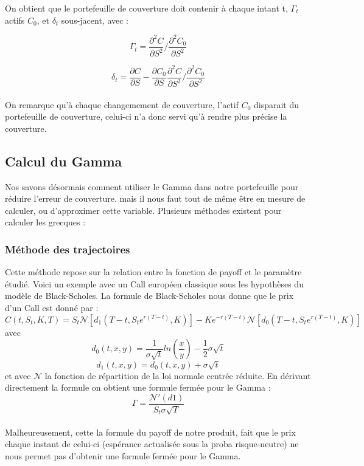 \documentclass[french,12pt,a4paper]{article}
\begin{document}
On obtient que le portefeuille de couverture doit contenir à chaque intant t,  $\Gamma_t$ actifs $C_0$, et $\delta_t$ sous-jacent, avec : 

$$ \Gamma_t = \frac{\partial^2 C}{\partial S^2} \slash \frac{\partial^2 C_0}{\partial S^2}  $$ 

$$ \delta_t = \frac{\partial C}{\partial S} - \frac{\partial C_0}{\partial S} \frac{\partial^2 C}{\partial S^2} \slash \frac{\partial^2 C_0}{\partial S^2}    $$
\\
On remarque qu'à chaque changemement de couverture, l'actif $C_0$ disparait du portefeuille de couverture, celui-ci n'a donc servi qu'à rendre plus précise la couverture.
\subsection{Calcul du Gamma}
Nos savons désormais comment utiliser le Gamma dans notre portefeuille pour réduire l'erreur de couverture. mais il nous faut tout de même être en mesure de calculer, ou d'approximer cette variable. Plusieurs méthodes existent pour calculer les grecques : 
\subsubsection{Méthode des trajectoires}
Cette méthode repose sur la relation entre la fonction de payoff et le paramètre étudié. Voici un exemple avec un Call européen classique sous les hypothèses du modèle de Black-Scholes. La formule de Black-Scholes nous donne que le prix d'un Call est donné par :
$$ C(t, S_t, K, T) = S_t \mathcal{N} \left [ d_1(T-t,S_te^{r(T-t)},K) \right ] - Ke^{-r(T-t)} \mathcal{N} \left [ d_0(T-t,S_te^{r(T-t)},K) \right ]  $$
avec 
$$ d_0(t,x,y) = \frac{1}{\sigma \sqrt{t}} ln(\frac{x}{y}) - \frac{1}{2} \sigma \sqrt{t} $$
$$ d_1(t,x,y) = d_0(t,x,y) + \sigma \sqrt{t} $$
et avec $ \mathcal{N} $ la fonction de répartition de la loi normale centrée réduite. 
En dérivant directement la formule on obtient une formule fermée pour le Gamma : 
$$ \Gamma = \frac{\mathcal{N}'(d1)}{S_t \sigma \sqrt{T}}  $$
\\
Malheureusement, cette la formule du payoff de notre produit, fait que le prix  chaque instant de celui-ci (espérance actualisée sous la proba risque-neutre) ne nous permet pas d'obtenir une formule fermée pour le Gamma.
\end{document}
